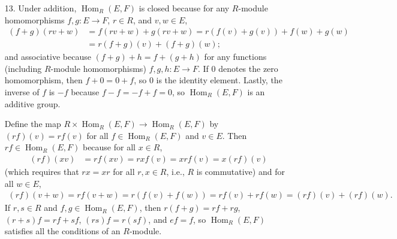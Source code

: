 \documentclass[12pt]{article}
\DeclareMathOperator{\Hom}{Hom}
\begin{document}
\begin{enumerate}
    \item[13.]
        Under addition, $\Hom_R(E, F)$ is closed because for any $R$-module homomorphisms $f, g : E \to F$, $r \in R$, and $v, w \in E$,
        \begin{align*}
            (f + g)(rv + w)
            &= f(rv + w) + g(rv + w) = r(f(v) + g(v)) + f(w) + g(w) \\
            &= r(f + g)(v) + (f + g)(w);
        \end{align*}
        and associative because $(f + g) + h = f + (g + h)$ for any functions (including $R$-module homomorphisms) $f, g, h : E \to F$. If $0$ denotes the zero homomorphism, then $f + 0 = 0 + f$, so $0$ is the identity element. Lastly, the inverse of $f$ is $-f$ because $f - f = -f + f = 0$, so $\Hom_R(E, F)$ is an additive group. \par
        Define the map $R \times \Hom_R(E, F) \to \Hom_R(E, F)$ by $(rf)(v) = rf(v)$ for all $f \in \Hom_R(E, F)$ and $v \in E$. Then $rf \in \Hom_R(E, F)$ because for all $x \in R$,
        \begin{align*}
            (rf)(xv) &= rf(xv) = rxf(v) = xrf(v) = x(rf)(v)
        \end{align*}
        (which requires that $rx = xr$ for all $r, x \in R$, i.e., $R$ is commutative) and for all $w \in E$,
        \begin{align*}
            (rf)(v + w) = rf(v + w) = r(f(v) + f(w)) = rf(v) + rf(w) = (rf)(v) + (rf)(w).
        \end{align*}
        If $r, s \in R$ and $f, g \in \Hom_R(E, F)$, then $r(f + g) = rf + rg$, $(r + s)f = rf + sf$, $(rs)f = r(sf)$, and $ef = f$, so $\Hom_R(E, F)$ satisfies all the conditions of an $R$-module.


\end{enumerate}
\end{document}
